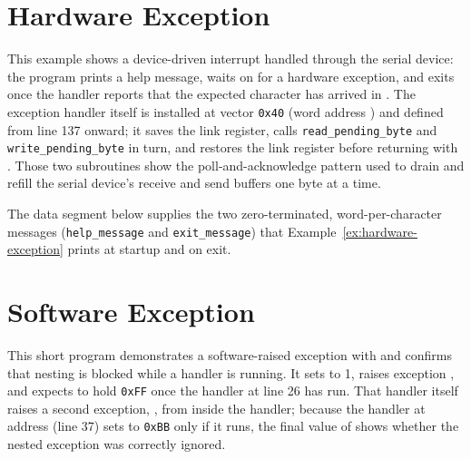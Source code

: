 \label{ex:faults-high}


\section{Hardware Exception}

This example shows a device-driven interrupt handled through the serial device: the program prints a help message,
waits on  for a hardware exception, and exits once the handler reports that the expected character has
arrived in . The exception handler itself is installed at vector \texttt{0x40} (word address ) and
defined from line 137 onward; it saves the link register, calls \texttt{read\_pending\_byte} and
\texttt{write\_pending\_byte} in turn, and restores the link register before returning with . Those two
subroutines show the poll-and-acknowledge pattern used to drain and refill the serial device's receive and send buffers
one byte at a time.

\label{ex:hardware-exception}


The data segment below supplies the two zero-terminated, word-per-character messages (\texttt{help\_message} and
\texttt{exit\_message}) that Example~\ref{ex:hardware-exception} prints at startup and on exit.

\label{ex:hardware-exception-data}


\section{Software Exception}

This short program demonstrates a software-raised exception with  and confirms that nesting is blocked
while a handler is running. It sets  to 1, raises exception , and expects  to hold
\texttt{0xFF} once the handler at line 26 has run. That handler itself raises a second exception, , from
inside the handler; because the handler at address  (line 37) sets  to \texttt{0xBB} only if it
runs, the final value of  shows whether the nested exception was correctly ignored.

